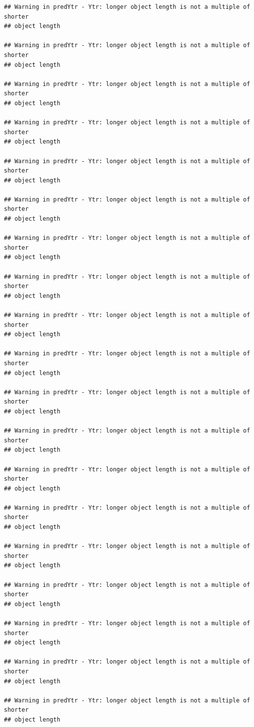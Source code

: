 \documentclass[]{article}
\begin{document}
\begin{verbatim}
## Warning in predYtr - Ytr: longer object length is not a multiple of shorter
## object length

## Warning in predYtr - Ytr: longer object length is not a multiple of shorter
## object length

## Warning in predYtr - Ytr: longer object length is not a multiple of shorter
## object length

## Warning in predYtr - Ytr: longer object length is not a multiple of shorter
## object length

## Warning in predYtr - Ytr: longer object length is not a multiple of shorter
## object length

## Warning in predYtr - Ytr: longer object length is not a multiple of shorter
## object length

## Warning in predYtr - Ytr: longer object length is not a multiple of shorter
## object length

## Warning in predYtr - Ytr: longer object length is not a multiple of shorter
## object length

## Warning in predYtr - Ytr: longer object length is not a multiple of shorter
## object length

## Warning in predYtr - Ytr: longer object length is not a multiple of shorter
## object length

## Warning in predYtr - Ytr: longer object length is not a multiple of shorter
## object length

## Warning in predYtr - Ytr: longer object length is not a multiple of shorter
## object length

## Warning in predYtr - Ytr: longer object length is not a multiple of shorter
## object length

## Warning in predYtr - Ytr: longer object length is not a multiple of shorter
## object length

## Warning in predYtr - Ytr: longer object length is not a multiple of shorter
## object length

## Warning in predYtr - Ytr: longer object length is not a multiple of shorter
## object length

## Warning in predYtr - Ytr: longer object length is not a multiple of shorter
## object length

## Warning in predYtr - Ytr: longer object length is not a multiple of shorter
## object length

## Warning in predYtr - Ytr: longer object length is not a multiple of shorter
## object length


\end{verbatim}
\end{document}
